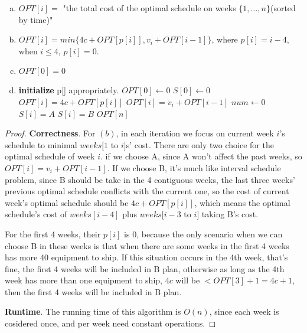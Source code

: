 \documentclass[paper=a4, fontsize=11pt]{scrartcl} %
\numberwithin{equation}{section} %
\numberwithin{figure}{section} %
\numberwithin{table}{section} %
\newenvironment{myproof}{\begin{proof}\setlength{\parindent}{2em}}{\end{proof}}
\begin{document}
\begin{enumerate}[(a)]
\item
$OPT[i] = $ "the total cost of the optimal schedule on weeks $\{1, \ldots , n\}$(sorted by time)"
\item
$OPT[i] = min\{4c+OPT[p[i]],  v_i+OPT[i-1]\}$, where $p[i]=i-4$, when $i\leq 4$, $p[i] = 0$.
\item
$OPT[0] = 0$
\item
\begin{algorithmic}
\STATE \textbf{initialize} p[] appropriately.
\STATE $OPT[0] \leftarrow 0$
\STATE $S[0] \leftarrow 0$
		\STATE  $OPT[i] = 4c + OPT[p[i]]$
	\ELSE
		\STATE $OPT[i] = v_i+OPT[i-1]$
	\ENDIF
\ENDFOR
\STATE $num \leftarrow 0$
		\STATE $S[i] = A$
	\ELSE
		\STATE $S[i] = B$
	\ENDIF
\ENDFOR
\RETURN $OPT[n]$
\end{algorithmic}
\end{enumerate}
\begin{myproof}
\textbf{Correctness}. 
For $(b)$,  in each iteration we focus on current week $i$'s schedule to minimal $weeks[1$ to $i]$s' cost. There are only two choice for the optimal schedule of week $i$. if we choose A, since A won't affect the past weeks, so $OPT[i] = v_i + OPT[i-1]$. If we choose B, it's much like interval schedule problem, since B should be take in the 4 contiguous weeks, the last three weeks' previous optimal schedule conflicts with the current one, so the cost of current week's optimal schedule should be $4c+OPT[p[i]]$, which means the optimal schedule's cost of $weeks[i-4]$ plus $weeks[i-3$ to $i]$ taking B's cost.

For the first 4 weeks, their $p[i]$ is 0, because the only scenario when we can choose B in these weeks is that when there are some weeks in the first 4 weeks has more 40 equipment to ship. If this situation occurs in the 4th week, that's fine, the first 4 weeks will be included in B plan, otherwise as long as the 4th week has more than one equipment to ship, $4c$ will be $< OPT[3]+1 = 4c+1$, then the first 4 weeks will be included in B plan.

\textbf{Runtime}.
The running time of this algorithm is $O(n)$, since each week is cosidered once, and per week need constant operations.
\end{myproof}
\end{document}
